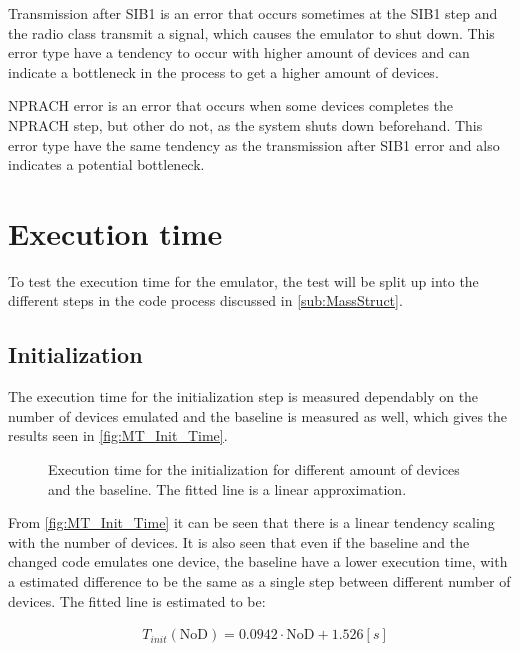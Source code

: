 Transmission after SIB1 is an error that occurs sometimes at the SIB1 step and the radio class transmit a signal, which causes the emulator to shut down. This error type have a tendency to occur with higher amount of devices and can indicate a bottleneck in the process to get a higher amount of devices.

NPRACH error is an error that occurs when some devices completes the NPRACH step, but other do not, as the system shuts down beforehand. This error type have the same tendency as the transmission after SIB1 error and also indicates a potential bottleneck.

\section{Execution time}
\label{sec:exeTime}
To test the execution time for the emulator, the test will be split up into the different steps in the code process discussed in \autoref{sub:MassStruct}.

\subsection{Initialization}
The execution time for the initialization step is measured dependably on the number of devices emulated and the baseline is measured as well, which gives the results seen in \autoref{fig:MT_Init_Time}.


\begin{figure}[H]
\centering
\resizebox{0.7\textwidth}{!}{
}
\caption{Execution time for the initialization for different amount of devices and the baseline. The fitted line is a linear approximation.}
\label{fig:MT_Init_Time}
\end{figure}

From \autoref{fig:MT_Init_Time} it can be seen that there is a linear tendency scaling with the number of devices. It is also seen that even if the baseline and the changed code emulates one device, the baseline have a lower execution time, with a estimated difference to be the same as a single step between different number of devices. The fitted line is estimated to be:

\begin{align}
&T_{init} (\text{NoD}) = 0.0942 \cdot \text{NoD} + 1.526 [s]
\end{align}
\begin{where}
\end{where}


